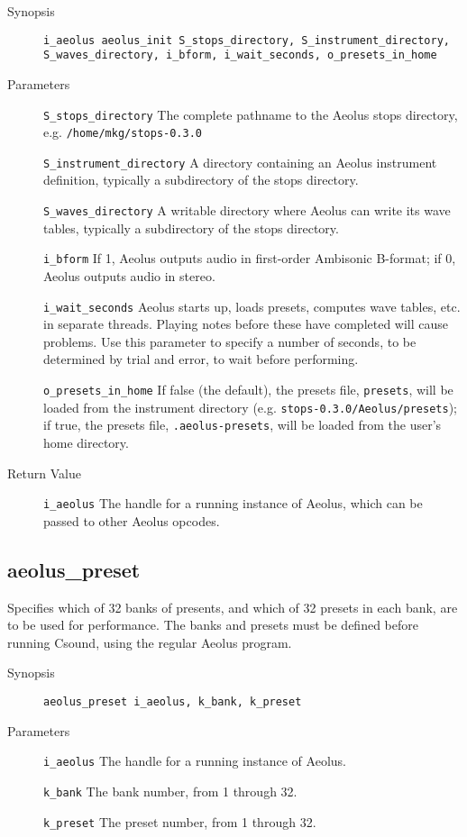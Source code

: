 \documentclass[english,11pt,letterpaper,onecolumn]{scrartcl}
\begin{document}
{\begin{description}
	\item[Synopsis]
	\item[]\lstinline|i_aeolus aeolus_init S_stops_directory, S_instrument_directory, S_waves_directory, i_bform, i_wait_seconds, o_presets_in_home|
	\item[Parameters]
	\item[]\lstinline|S_stops_directory| The complete pathname to the Aeolus stops directory, e.g. \lstinline|/home/mkg/stops-0.3.0|
	\item[]\lstinline|S_instrument_directory| A directory containing an Aeolus instrument definition, typically a subdirectory of the stops directory.
	\item[]\lstinline|S_waves_directory| A writable directory where Aeolus can write its wave tables, typically a subdirectory of the stops directory.
	\item[]\lstinline|i_bform| If 1, Aeolus outputs audio in first-order Ambisonic B-format; if 0, Aeolus outputs audio in stereo.
	\item[]\lstinline|i_wait_seconds| Aeolus starts up, loads presets, computes wave tables, etc. in separate threads. Playing notes before these have completed will cause problems. Use this parameter to specify a number of seconds, to be determined by trial and error, to wait before performing.
	\item[]\lstinline|o_presets_in_home| If false (the default), the presets file, \lstinline|presets|, will be loaded from the instrument directory (e.g. \lstinline|stops-0.3.0/Aeolus/presets|); if true, the presets file, \lstinline|.aeolus-presets|, will be loaded from the user's home directory. 	
	\item[Return Value]
	\item[]\lstinline|i_aeolus| The handle for a running instance of Aeolus, which can be passed to other Aeolus opcodes.
\end{description}

\subsection*{aeolus\_preset}

Specifies which of 32 banks of presents, and which of 32 presets in each bank, are to be used for performance. The banks and presets must be defined before running Csound, using the regular Aeolus program.

\begin{description}
	\item[Synopsis]
	\item[]\lstinline|aeolus_preset i_aeolus, k_bank, k_preset|
	\item[Parameters]
	\item[]\lstinline|i_aeolus| The handle for a running instance of Aeolus.
	\item[]\lstinline|k_bank| The bank number, from 1 through 32.
	\item[]\lstinline|k_preset| The preset number, from 1 through 32.
\end{description}

}
\end{document}
